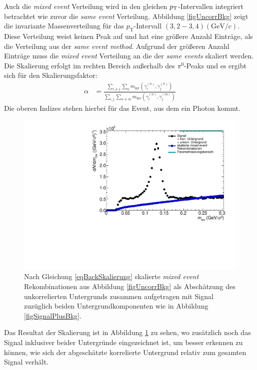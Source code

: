 \newline
Auch die \textit{mixed event} Verteilung wird in den gleichen $p_{\rm{T}}$-Intervallen integriert betrachtet wie zuvor die \textit{same event} Verteilung.
Abbildung \ref{figUncorrBkg} zeigt die invariante Massenverteilung f\"ur das $p_{\text{T}}$-Intervall $(3,2 - 3,4) (\text{GeV/}c)$.
Diese Verteilung weist keinen Peak auf und hat eine gr{\"o}{\ss}ere Anzahl Eintr{\"a}ge, als die Verteilung aus der \textit{same event method}.
Aufgrund der gr{\"o}{\ss}eren Anzahl Eintr{\"a}ge muss die \textit{mixed event} Verteilung an die der \textit{same events} skaliert werden.
Die Skalierung erfolgt im rechten Bereich au{\ss}erhalb des $\pi^{0}$-Peaks und es ergibt sich f{\"u}r den Skalierungsfaktor:
\begin{align}
\label{eqBackSkalierung}
\alpha &= \frac{\sum_{i \neq j}\sum_{n}m_{\text{inv}}\left( \gamma^{(n)}_{i},\gamma^{(n)}_{j}\right) }{\sum_{i,j}\sum_{n \neq m}m_{\text{inv}}\left( \gamma^{(n)}_{i},\gamma^{(m)}_{j}\right) }
\end{align}
Die oberen Indizes stehen hierbei f{\"u}r das Event, aus dem ein Photon kommt.
\begin{figure}[thp]
\centering
\includegraphics[width=.75\linewidth]{hUncorrBkgNorm.pdf}
\caption{Nach Gleichung \ref{eqBackSkalierung} skalierte {\it mixed event} Rekombinationen aus Abbildung \ref{figUncorrBkg} als Absch{\"a}tzung des unkorrelierten Untergrunds zusammen aufgetragen mit Signal zuz{\"u}glich beiden Untergrundkomponenten wie in Abbildung \ref{figSignalPlusBkg}.}
\label{figUncorrBkgNorm}
\end{figure}
\newline
Das Resultat der Skalierung ist in Abbildung \ref{figUncorrBkgNorm} zu sehen, wo zus{\"a}tzlich noch das Signal inklusiver beider Untergr{\"u}nde eingezeichnet ist, um besser erkennen zu k{\"o}nnen, wie sich der abgesch{\"a}tzte korrelierte Untergrund relativ zum gesamten Signal verh{\"a}lt.

